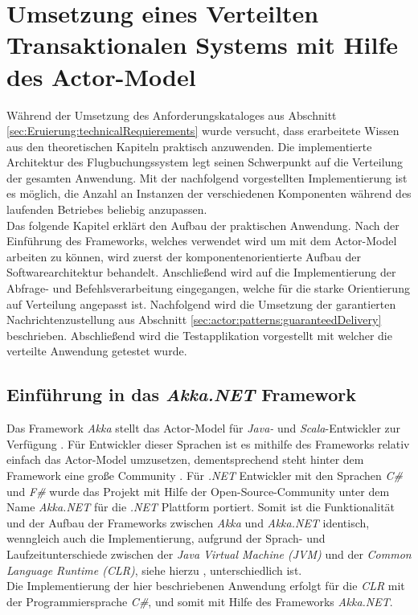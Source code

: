   \chapter{Umsetzung eines Verteilten Transaktionalen Systems mit Hilfe des Actor-Model} 
\label{cha:practicalDevelopment}

Während der Umsetzung des Anforderungskataloges aus Abschnitt \ref{sec:Eruierung:technicalRequierements} wurde versucht, dass erarbeitete Wissen aus den theoretischen Kapiteln praktisch anzuwenden. Die implementierte Architektur des Flugbuchungssystem legt seinen Schwerpunkt auf die Verteilung der gesamten Anwendung. Mit der nachfolgend vorgestellten Implementierung ist es möglich, die Anzahl an Instanzen der verschiedenen Komponenten während des laufenden Betriebes beliebig anzupassen. \\
Das folgende Kapitel erklärt den Aufbau der praktischen Anwendung. Nach der Einführung des Frameworks, welches verwendet wird um mit dem  Actor-Model arbeiten zu können, wird zuerst der komponentenorientierte Aufbau der Softwarearchitektur behandelt. Anschließend wird auf die Implementierung der Abfrage- und Befehlsverarbeitung eingegangen, welche für die starke Orientierung auf Verteilung angepasst ist. Nachfolgend wird die Umsetzung der garantierten Nachrichtenzustellung aus Abschnitt \ref{sec:actor:patterns:guaranteedDelivery} beschrieben. Abschließend wird die Testapplikation vorgestellt mit welcher die verteilte Anwendung getestet wurde.

\section{Einführung in das \textit{Akka.NET} Framework}
\label{sec:implementation:akka}
Das Framework \textit{Akka} stellt das Actor-Model für \textit{Java-} und \textit{Scala}-Entwickler zur Verfügung \citep{gupta2012akkaEssentiaol}. Für Entwickler dieser Sprachen ist es mithilfe des Frameworks relativ einfach das Actor-Model umzusetzen, dementsprechend steht hinter dem Framework eine große Community \citep{Vernon2015ReactiveAkka}. Für \textit{.NET} Entwickler mit den Sprachen \textit{C\#} und \textit{F\#} wurde das Projekt mit Hilfe der Open-Source-Community unter dem Name \textit{Akka.NET} für die \textit{.NET} Plattform portiert. Somit ist die Funktionalität und der Aufbau der Frameworks zwischen \textit{Akka} und \textit{Akka.NET} identisch, wenngleich auch die Implementierung, aufgrund der Sprach- und Laufzeitunterschiede zwischen der \textit{Java Virtual Machine (JVM)} und der \textit{Common Language Runtime (CLR)}, siehe hierzu \cite{JvmVsClrsinger2003jvm}, unterschiedlich ist. \\
Die Implementierung der hier beschriebenen Anwendung erfolgt für die \textit{CLR} mit der Programmiersprache \textit{C\#}, und somit mit Hilfe des Frameworks \textit{Akka.NET}. 

